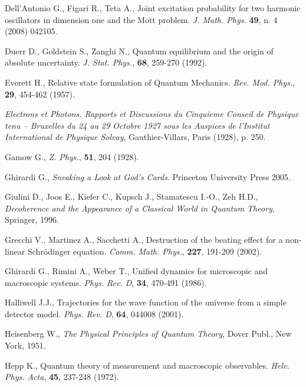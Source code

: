 \documentclass[12pt,reqno]{amsart}
\numberwithin{equation}{section}
\begin{document}
\begin{thebibliography}{99}
 Dell'Antonio G., Figari R., Teta A., Joint excitation probability for two harmonic oscillators in dimension one and the Mott problem. {\em J. Math. Phys.} {\bf 49}, n. 4 (2008) 042105.


 Duerr D., Goldstein S., Zanghi N., Quantum equilibrium and the origin of absolute uncertainty. {\em J. Stat. Phys.}, {\bf 68}, 259-270 (1992).

 Everett H., Relative state formulation of Quantum Mechanics. {\em Rev. Mod. Phys.}, {\bf 29}, 454-462 (1957).

 {\em Electrons et Photons. Rapports et Discussions du Cinquieme Conseil de Physique tenu -- Bruxelles du 24 au 29 Octobre 1927 sous les Auspices de l'Institut International de Physique Solvay}, Gauthier-Villars, Paris (1928), p. 250.


 Gamow G., {\em Z. Phys.}, {\bf 51}, 204 (1928).

 Ghirardi G., {\em Sneaking a Look at God's Cards}. Princeton University Press 2005.

 Giulini D., Joos E., Kiefer C., Kupsch J., Stamatescu I.-O., Zeh
H.D., {\em Decoherence and the Appearance of a Classical World in
Quantum Theory}, Springer, 1996.


 Grecchi V., Martinez A., Sacchetti A., Destruction of the beating effect for a non-linear Schr\"{o}dinger equation. {\em Comm. Math. Phys.}, {\bf 227}, 191-209 (2002).

 Ghirardi G., Rimini  A., Weber T., Unified dynamics for microscopic and macroscopic systems. {\em Phys. Rev. D}, {\bf 34}, 470-491 (1986). 

 Halliwell J.J., Trajectories for the wave function of the universe from a simple detector model. {\em Phys. Rev. D}, {\bf 64}, 044008 (2001).

 Heisenberg W., {\em The Physical Principles of Quantum Theory}, Dover Publ., New York, 1951.

 Hepp K., Quantum theory of measurement and macroscopic observables. {\em Helv. Phys. Acta}, {\bf 45}, 237-248 (1972).


\end{thebibliography}
\end{document}
